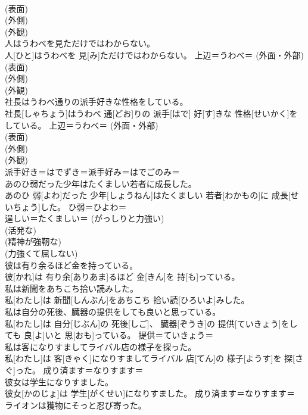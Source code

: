 \documentclass[8pt]{extreport}
\begin{document}
\begin{CJK}{UTF8}{min}
{\\	(表面) 
\\	(外側) 
\\	(外観) 
\\	人はうわべを見ただけではわからない。	
\\	人[ひと]はうわべを 見[み]ただけではわからない。	上辺＝うわべ＝ (外面・外部) 
\\	(表面) 
\\	(外側) 
\\	(外観) 
\\	社長はうわべ通りの派手好きな性格をしている。	
\\	社長[しゃちょう]はうわべ 通[どお]りの 派手[はで] 好[す]きな 性格[せいかく]をしている。	上辺＝うわべ＝ (外面・外部) 
\\	(表面) 
\\	(外側) 
\\	(外観) 
\\	派手好き＝はでずき＝派手好み＝はでごのみ＝ 
\\	あのひ弱だった少年はたくましい若者に成長した。	
\\	あのひ 弱[よわ]だった 少年[しょうねん]はたくましい 若者[わかもの]に 成長[せいちょう]した。	ひ弱＝ひよわ＝ 
\\	逞しい＝たくましい＝ (がっしりと力強い) 
\\	(活発な) 
\\	(精神が強靭な) 
\\	(力強くて屈しない) 
\\	彼は有り余るほど金を持っている。	
\\	彼[かれ]は 有り余[ありあま]るほど 金[きん]を 持[も]っている。	
\\	私は新聞をあちこち拾い読みした。	
\\	私[わたし]は 新聞[しんぶん]をあちこち 拾い読[ひろいよ]みした。	
\\	私は自分の死後、臓器の提供をしても良いと思っている。	
\\	私[わたし]は 自分[じぶん]の 死後[しご]、 臓器[ぞうき]の 提供[ていきょう]をしても 良[よ]いと 思[おも]っている。	提供＝ていきょう＝ 
\\	私は客になりすましてライバル店の様子を探った。	
\\	私[わたし]は 客[きゃく]になりすましてライバル 店[てん]の 様子[ようす]を 探[さぐ]った。	成り済ます＝なりすます＝ 
\\	彼女は学生になりすました。	
\\	彼女[かのじょ]は 学生[がくせい]になりすました。	成り済ます＝なりすます＝ 
\\	ライオンは獲物にそっと忍び寄った。	
}
\end{CJK}
\end{document}
